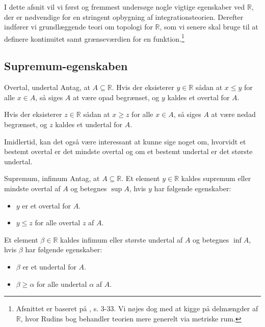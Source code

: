 I dette afsnit vil vi først og fremmest undersøge nogle vigtige egenskaber ved $\mathbb{R}$, der er nødvendige for en stringent opbygning af integrationsteorien.
Derefter indfører vi grundlæggende teori om topologi for $\mathbb{R}$, som vi senere skal bruge til at definere kontinuitet samt grænseværdien for en funktion.\footnote{Afsnittet er baseret på \cite{Rudin1976}, s. 3-33. Vi nøjes dog med at kigge på delmængder af $\mathbb{R}$, hvor Rudins bog behandler teorien mere generelt via metriske rum.}

\subsection{Supremum-egenskaben}%
  \label{sub:Supremum-egenskaben}

\begin{definition}[label=def:overtal]{Overtal, undertal}{}
  Antag, at $A \subseteq \mathbb{R}$. 
  Hvis der eksisterer $y \in \mathbb{R}$ sådan at $x \leq y$ for alle $x \in A$, så siges $A$ at være opad begrænset, og $y$ kaldes et overtal for $A$. 

  Hvis der eksisterer $z \in \mathbb{R}$ sådan at $x \geq z$ for alle $x \in A$, så siges $A$ at være nedad begrænset, og $z$ kaldes et undertal for $A$. 
\end{definition}

Imidlertid, kan det også være interessant at kunne sige noget om, hvorvidt et bestemt overtal er det mindste overtal og om et bestemt undertal er det største undertal.

\begin{definition}[label=def:sup]{Supremum, infimum}{}
  Antag, at $A \subseteq \mathbb{R}$. Et element $y \in \mathbb{R}$ kaldes supremum eller mindste overtal af $A$ og betegnes $\sup A$, hvis $y$ har følgende egenskaber:
  \begin{itemize}
    \item $y$ er et overtal for $A$.
    \item $y \leq z$ for alle overtal $z$ af $A$. 
  \end{itemize}
  Et element $\beta \in \mathbb{R}$ kaldes infimum eller største undertal af $A$ og betegnes $\inf A$, hvis $\beta$ har følgende egenskaber:
  \begin{itemize}
    \item $\beta$ er et undertal for $A$.
    \item $\beta \geq \alpha$ for alle undertal $\alpha$ af $A$. 
  \end{itemize}
\end{definition}


